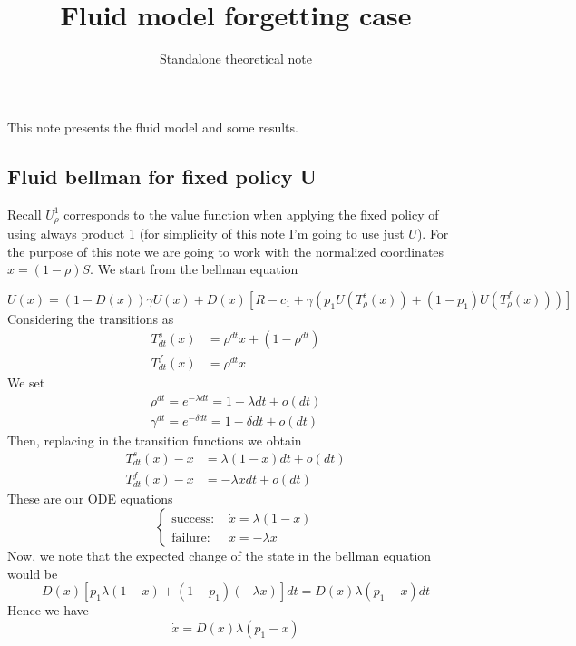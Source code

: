 \documentclass[11pt]{article}
\title{Fluid model forgetting case}
\author{Standalone theoretical note}
\date{}
\begin{document}
\maketitle

This note presents the fluid model and some results. 

\subsection*{Fluid bellman for fixed policy U}
Recall $U^1_\rho$ corresponds to the value function when applying the fixed policy of using always product 1 (for simplicity of this note I'm going to use just $U$). For the purpose of this note we are going to work with the normalized coordinates $x = (1-\rho)S$. We start from the bellman equation

\begin{equation}
  U(x) = (1-D(x)) \gamma U(x)+ D(x)[ R-c_1 + \gamma(p_1U(T^s_\rho(x)) + (1-p_1)U(T^f_\rho(x)))]
\end{equation}
Considering the transitions as 
\begin{align}
  T^s_{dt}(x) &= \rho^{dt}x + (1-\rho^{dt}) \\
  T^f_{dt}(x) &= \rho^{dt}x
\end{align}
We set 
\begin{align*}
  \rho^{dt} = e^{-\lambda dt} = 1- \lambda dt + o(dt)\\
  \gamma^{dt} = e^{-\delta dt} = 1- \delta dt + o(dt)
\end{align*}
Then, replacing in the transition functions we obtain
\begin{align}
  T^s_{dt}(x) - x &= \lambda(1- x)dt + o(dt)\\
  T^f_{dt}(x) - x &= -\lambda xdt + o(dt)
\end{align}
These are our ODE equations
\begin{equation}
  \begin{cases}
    \text{success: } &\dot{x} = \lambda(1- x)\\
    \text{failure: } &\dot{x} = -\lambda x 
  \end{cases}
\end{equation}
Now, we note that the expected change of the state in the bellman equation would be 
\begin{equation}
  D(x)[p_1 \lambda(1-x) + (1-p_1)(-\lambda x)] dt = D(x) \lambda (p_1-x)dt
\end{equation}
Hence we have 
\begin{equation}
  \dot{x}= D(x)\lambda (p_1-x) 
\end{equation}
\end{document}
